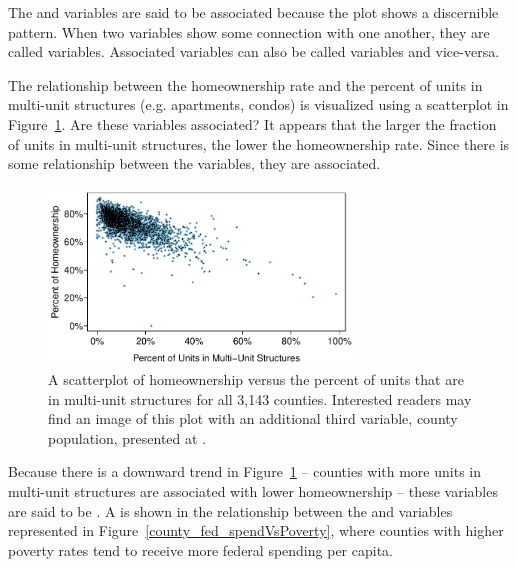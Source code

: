The  and  variables are said to be associated because the plot shows a discernible pattern. When two variables show some connection with one another, they are called  variables. Associated variables can also be called  variables and vice-versa.

\begin{example}{The relationship between the homeownership rate and the percent of units in multi-unit structures (e.g. apartments, condos) is visualized using a scatterplot in Figure~\ref{multiunitsVsOwnership}. Are these variables associated?}
It appears that the larger the fraction of units in multi-unit structures, the lower the homeownership rate. Since there is some relationship between the variables, they are associated.
\end{example}


\begin{figure}
   \centering
   \includegraphics[width=0.72\textwidth]{ch_data_collection/figures/multiunitsVsOwnership/multiunitsVsOwnership}
   \caption{A scatterplot of homeownership versus the percent of units that are in multi-unit structures for all 3,143 counties. Interested readers may find an image of this plot with an additional third variable, county population, presented at .}
   \label{multiunitsVsOwnership}
\end{figure}

Because there is a downward trend in Figure~\ref{multiunitsVsOwnership} -- counties with more units in multi-unit structures are associated with lower homeownership -- these variables are said to be . A  is shown in the relationship between the  and  variables represented in Figure~\ref{county_fed_spendVsPoverty}, where counties with higher poverty rates tend to receive more federal spending per capita.


